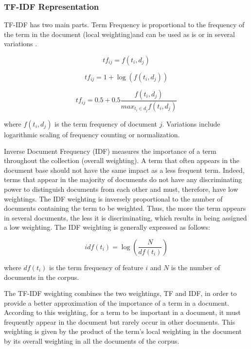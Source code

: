 \subsubsection*{TF-IDF Representation}

TF-IDF has two main parts. Term Frequency is proportional to the frequency of the term in the document (local weighting)and can be used as is or in several variations \citep{sable2001using, singhal1997learning}.

$$t f _ { i j } = f \left( t _ { i } , d _ { j } \right)$$

$$t f _ { i j } = 1 + \log \left( f \left( t _ { i } , d _ { j } \right) \right)$$

$$ t f _ { i j } = 0.5 + 0.5 \frac { f \left( t _ { i } , d _ { j } \right) } { m a x _ { t _ { i } \in d _ { j } } f \left( t _ { i } , d _ { j } \right) }$$

where $f(t_{i},d_{j})$ is the term frequency of document $j$. Variations include logarithmic scaling of frequency counting or normalization. 

Inverse Document Frequency (IDF) measures the importance of a term throughout the collection (overall weighting). A term that often appears in the document base should not have the same impact as a less frequent term. Indeed, terms that appear in the majority of documents do not have any discriminating power to distinguish documents from each other and must, therefore, have low weightings. The IDF weighting is inversely proportional to the number of documents containing the term to be weighted. Thus, the more the term appears in several documents, the less it is discriminating, which results in being assigned a low weighting. The IDF weighting is generally expressed as follows:

$$i d f \left( t _ { i } \right) = \log \left( \frac { N } { d f \left( t _ { i } \right) } \right)$$

where $df(t_{i})$ is the term frequency of feature $i$ and $N$ is the number of documents in the corpus.

The TF-IDF weighting combines the two weightings, TF and IDF, in order to
provide a better approximation of the importance of a term in a
document. According to this weighting, for a term to be important in a
document, it must frequently appear in the document but rarely occur in other
documents. This weighting is given by the product of the term's local weighting
in the document by its overall weighting in all the
documents of the corpus.

